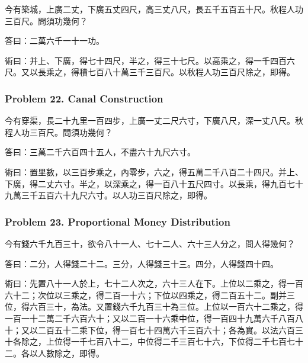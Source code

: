 \documentclass[11pt,a4paper]{article}
\newcommand{\zh}[1]{{\CJKfamily{}#1}}
\begin{document}
\begin{problembox}[title=\zh{問}]
\zh{今有築城，上廣二丈，下廣五丈四尺，高三丈八尺，長五千五百五十尺。秋程人功三百尺。問須功幾何？}
\end{problembox}
\begin{answerbox}[title=\zh{答}]
\zh{答曰：二萬六千一十一功。}
\end{answerbox}
\begin{methodbox}[title=\zh{術}]
\zh{術曰：并上、下廣，得七十四尺，半之，得三十七尺。以高乘之，得一千四百六尺。又以長乘之，得積七百八十萬三千三百尺。以秋程人功三百尺除之，即得。}
\end{methodbox}

\subsubsection*{Problem 22. Canal Construction}

\begin{problembox}[title=\zh{問}]
\zh{今有穿渠，長二十九里一百四步，上廣一丈二尺六寸，下廣八尺，深一丈八尺。秋程人功三百尺。問須功幾何？}
\end{problembox}
\begin{answerbox}[title=\zh{答}]
\zh{答曰：三萬二千六百四十五人，不盡六十九尺六寸。}
\end{answerbox}
\begin{methodbox}[title=\zh{術}]
\zh{術曰：置里數，以三百步乘之，內零步，六之，得五萬二千八百二十四尺。并上、下廣，得二丈六寸。半之，以深乘之，得一百八十五尺四寸。以長乘，得九百七十九萬三千五百六十九尺六寸。以人功三百尺除之，即得。}
\end{methodbox}

\subsubsection*{Problem 23. Proportional Money Distribution}

\begin{problembox}[title=\zh{問}]
\zh{今有錢六千九百三十，欲令八十一人、七十二人、六十三人分之，問人得幾何？}
\end{problembox}
\begin{answerbox}[title=\zh{答}]
\zh{答曰：二分，人得錢二十二。三分，人得錢三十三。四分，人得錢四十四。}
\end{answerbox}
\begin{methodbox}[title=\zh{術}]
\zh{術曰：先置八十一人於上，七十二人次之，六十三人在下。上位以二乘之，得一百六十二；次位以三乘之，得二百一十六；下位以四乘之，得二百五十二。副并三位，得六百三十，為法。又置錢六千九百三十為三位。上位以一百六十二乘之，得一百一十二萬二千六百六十；又以二百一十六乘中位，得一百四十九萬六千八百八十；又以二百五十二乘下位，得一百七十四萬六千三百六十；各為實。以法六百三十各除之，上位得一千七百八十二，中位得二千三百七十六，下位得二千七百七十二。各以人數除之，即得。}
\end{methodbox}
\end{document}
